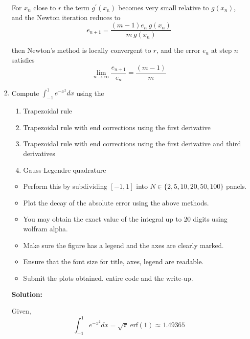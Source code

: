 \documentclass[a4paper,11pt]{report}
\begin{document}
\begin{enumerate}
    For $x_{n}$ close to $r$ the term $g^{\prime}(x_{n})$ becomes very small relative to $g(x_{n})$, and the Newton iteration reduces to
    \begin{equation*}
    e_{n+1} = \frac{(m-1)e_{n}\ g(x_{n})}{m\ g(x_{n})}
    \end{equation*}

    then Newton's method is locally convergent to $r$, and the error $e_{n}$ at step $n$ satisfies
    \begin{equation*}
    \lim_{n \rightarrow \infty} \frac{e_{n+1}}{e_{n}} = \frac{(m-1)}{m}
    \end{equation*}


    \item Compute $\displaystyle \int_{-1}^{1} e^{-x^{2}} dx$ using the

    \begin{enumerate}
    \item Trapezoidal rule
    \item Trapezoidal rule with end corrections using the first derivative
    \item Trapezoidal rule with end corrections using the first derivative and third
    derivatives
    \item Gauss-Legendre quadrature
    \end{enumerate}

    \begin{itemize}
    \item Perform this by subdividing $[-1, 1]$ into $N \in \{2, 5, 10, 20, 50, 100\}$ 
    panels.
    \item Plot the decay of the absolute error using the above methods.
    \item You may obtain the exact value of the integral up to $20$ digits using
    wolfram alpha.
    \item Make sure the figure has a legend and the axes are clearly marked.
    \item Ensure that the font size for title, axes, legend are readable.
    \item Submit the plots obtained, entire code and the write-up.
    \end{itemize}

    \textbf{Solution:}
        
    Given,
    \begin{equation*}
    \int_{-1}^{1} e^{-x^{2}} dx = \sqrt{\pi}\ \text{erf}(1) \approx 1.49365 
    \end{equation*}


\end{enumerate}
\end{document}
